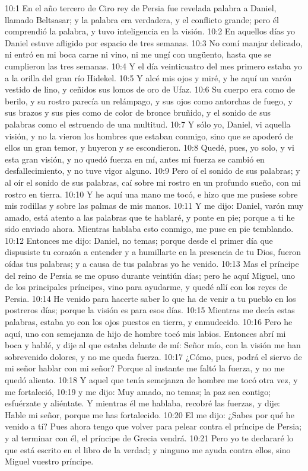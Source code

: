 10:1 En el año tercero de Ciro rey de Persia fue revelada palabra a Daniel, llamado Beltsasar; y la palabra era verdadera, y el conflicto grande; pero él comprendió la palabra, y tuvo inteligencia en la visión. 
10:2 En aquellos días yo Daniel estuve afligido por espacio de tres semanas. 
10:3 No comí manjar delicado, ni entró en mi boca carne ni vino, ni me ungí con ungüento, hasta que se cumplieron las tres semanas. 
10:4 Y el día veinticuatro del mes primero estaba yo a la orilla del gran río Hidekel. 
10:5 Y alcé mis ojos y miré, y he aquí un varón vestido de lino, y ceñidos sus lomos de oro de Ufaz. 
10:6 Su cuerpo era como de berilo, y su rostro parecía un relámpago, y sus ojos como antorchas de fuego, y sus brazos y sus pies como de color de bronce bruñido, y el sonido de sus palabras como el estruendo de una multitud. 
10:7 Y sólo yo, Daniel, vi aquella visión, y no la vieron los hombres que estaban conmigo, sino que se apoderó de ellos un gran temor, y huyeron y se escondieron. 
10:8 Quedé, pues, yo solo, y vi esta gran visión, y no quedó fuerza en mí, antes mi fuerza se cambió en desfallecimiento, y no tuve vigor alguno. 
10:9 Pero oí el sonido de sus palabras; y al oír el sonido de sus palabras, caí sobre mi rostro en un profundo sueño, con mi rostro en tierra. 
10:10 Y he aquí una mano me tocó, e hizo que me pusiese sobre mis rodillas y sobre las palmas de mis manos. 
10:11 Y me dijo: Daniel, varón muy amado, está atento a las palabras que te hablaré, y ponte en pie; porque a ti he sido enviado ahora. Mientras hablaba esto conmigo, me puse en pie temblando. 
10:12 Entonces me dijo: Daniel, no temas; porque desde el primer día que dispusiste tu corazón a entender y a humillarte en la presencia de tu Dios, fueron oídas tus palabras; y a causa de tus palabras yo he venido. 
10:13 Mas el príncipe del reino de Persia se me opuso durante veintiún días; pero he aquí Miguel, uno de los principales príncipes, vino para ayudarme, y quedé allí con los reyes de Persia. 
10:14 He venido para hacerte saber lo que ha de venir a tu pueblo en los postreros días; porque la visión es para esos días. 
10:15 Mientras me decía estas palabras, estaba yo con los ojos puestos en tierra, y enmudecido. 
10:16 Pero he aquí, uno con semejanza de hijo de hombre tocó mis labios. Entonces abrí mi boca y hablé, y dije al que estaba delante de mí: Señor mío, con la visión me han sobrevenido dolores, y no me queda fuerza. 
10:17 ¿Cómo, pues, podrá el siervo de mi señor hablar con mi señor? Porque al instante me faltó la fuerza, y no me quedó aliento. 
10:18 Y aquel que tenía semejanza de hombre me tocó otra vez, y me fortaleció, 
10:19 y me dijo: Muy amado, no temas; la paz sea contigo; esfuérzate y aliéntate. Y mientras él me hablaba, recobré las fuerzas, y dije: Hable mi señor, porque me has fortalecido. 
10:20 El me dijo: ¿Sabes por qué he venido a tí? Pues ahora tengo que volver para pelear contra el príncipe de Persia; y al terminar con él, el príncipe de Grecia vendrá. 
10:21 Pero yo te declararé lo que está escrito en el libro de la verdad; y ninguno me ayuda contra ellos, sino Miguel vuestro príncipe. 
